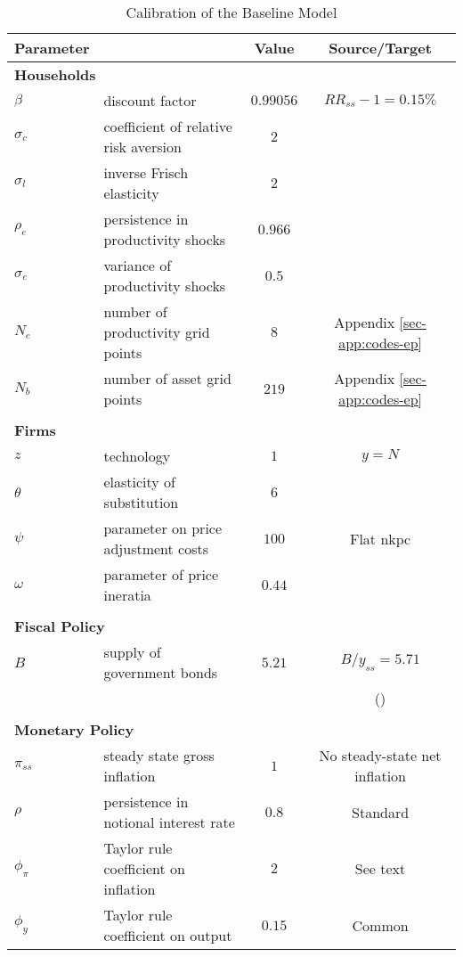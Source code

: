 \documentclass[12pt]{article} %
\numberwithin{equation}{section} %
\numberwithin{figure}{section}
\numberwithin{table}{section}
\begin{document}
\begin{table}[t]
\centering
\caption{Calibration of the Baseline Model}
\label{tab:calibration-baseline}
\begin{tabular}{llcc}
Parameter &   &  Value & Source/Target \\
\hline
\hline
\multicolumn{2}{l}{\textbf{Households}} & & \\
$\beta$ &  discount factor & $0.99056$ & $RR_{ss}-1 = 0.15\%$ \\
$\sigma_c$ & coefficient of relative risk aversion & $2$ & \textcite{auclert2021} \\
$\sigma_l$ & inverse Frisch elasticity & $2$ & \textcite{auclert2021} \\
$\rho_e$ & persistence in productivity shocks & $0.966$ & \textcite{auclert2021} \\
$\sigma_e$ & variance of productivity shocks & $0.5$ & \textcite{auclert2021} \\
$N_e$ & number of productivity grid points & $8$ & Appendix \ref{sec-app:codes-ep} \\
$N_b$ & number of asset grid points & $219$ & Appendix \ref{sec-app:codes-ep} \\
& & & \\
\multicolumn{2}{l}{\textbf{Firms}} & & \\
$z$ &  technology & $1$ & $y=N$ \\
$\theta$ & elasticity of substitution & $6$ & \textcite{auclert2021} \\
$\psi$ & parameter on price adjustment costs & $100$ & Flat \Gls{nkpc} \\
$\omega$ & parameter of price ineratia & $0.44$ & \textcite{gust2017wp} \\
& & & \\
\multicolumn{2}{l}{\textbf{Fiscal Policy}} & & \\
$B$ & supply of government bonds & $5.21$ & $B/y_{ss} = 5.71$ \\
& & & (\cite{mckay2016}) \\
& & & \\
\multicolumn{2}{l}{\textbf{Monetary Policy}} & & \\
$\pi_{ss}$ & steady state gross inflation & $1$ & No steady-state net inflation \\
$\rho$ & persistence in notional interest rate & $0.8$ & Standard \\
$\phi_{\pi}$ & Taylor rule coefficient on inflation & $2$ & See text \\
$\phi_{y}$ & Taylor rule coefficient on output & $0.15$ & Common \\

\end{tabular}
\end{table}
\end{document}
